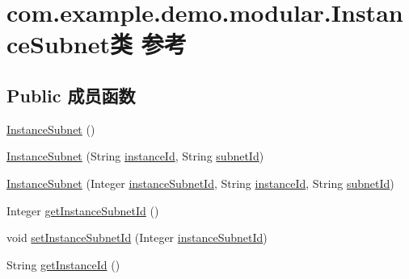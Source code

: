 \hypertarget{classcom_1_1example_1_1demo_1_1modular_1_1_instance_subnet}{}\section{com.\+example.\+demo.\+modular.\+Instance\+Subnet类 参考}
\label{classcom_1_1example_1_1demo_1_1modular_1_1_instance_subnet}
\subsection*{Public 成员函数}
\begin{DoxyCompactItemize}
\item 
\mbox{\hyperlink{classcom_1_1example_1_1demo_1_1modular_1_1_instance_subnet_a6ea7ce7f995c0c1534325c2c986e2e4b}{Instance\+Subnet}} ()
\item 
\mbox{\hyperlink{classcom_1_1example_1_1demo_1_1modular_1_1_instance_subnet_abf72dfa25585790e2b74f6ceea22f69d}{Instance\+Subnet}} (String \mbox{\hyperlink{classcom_1_1example_1_1demo_1_1modular_1_1_instance_subnet_a3c649750d3de2f1326907bec07514adf}{instance\+Id}}, String \mbox{\hyperlink{classcom_1_1example_1_1demo_1_1modular_1_1_instance_subnet_afaae557009253a371aa9c937799f6933}{subnet\+Id}})
\item 
\mbox{\hyperlink{classcom_1_1example_1_1demo_1_1modular_1_1_instance_subnet_afcf2d0d5c4ed003c89336e592db6337f}{Instance\+Subnet}} (Integer \mbox{\hyperlink{classcom_1_1example_1_1demo_1_1modular_1_1_instance_subnet_a592e96649a9b0f7ae2e9e97c825bb3ce}{instance\+Subnet\+Id}}, String \mbox{\hyperlink{classcom_1_1example_1_1demo_1_1modular_1_1_instance_subnet_a3c649750d3de2f1326907bec07514adf}{instance\+Id}}, String \mbox{\hyperlink{classcom_1_1example_1_1demo_1_1modular_1_1_instance_subnet_afaae557009253a371aa9c937799f6933}{subnet\+Id}})
\item 
Integer \mbox{\hyperlink{classcom_1_1example_1_1demo_1_1modular_1_1_instance_subnet_a2be4ad6787e6a079fe3dec68e0335ea3}{get\+Instance\+Subnet\+Id}} ()
\item 
void \mbox{\hyperlink{classcom_1_1example_1_1demo_1_1modular_1_1_instance_subnet_a2e9ed8109e490e8bc9d8c8b1a5895d65}{set\+Instance\+Subnet\+Id}} (Integer \mbox{\hyperlink{classcom_1_1example_1_1demo_1_1modular_1_1_instance_subnet_a592e96649a9b0f7ae2e9e97c825bb3ce}{instance\+Subnet\+Id}})
\item 
String \mbox{\hyperlink{classcom_1_1example_1_1demo_1_1modular_1_1_instance_subnet_aa2e89bdac659fb37536dac24d4e7f919}{get\+Instance\+Id}} ()

\end{DoxyCompactItemize}

